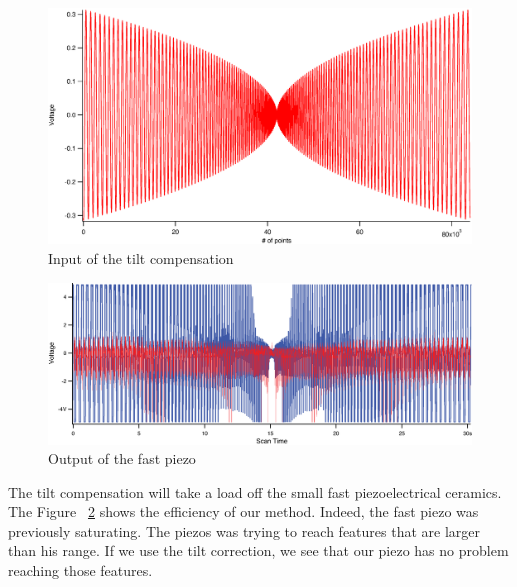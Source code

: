 \begin{figure}[H]
  \centering
  \includegraphics[scale=0.1]{images/spiralztiltout.eps}
    \caption{Input of the tilt compensation}
  \label{spiralztiltout}
\end{figure}



\begin{figure}[H]
  \centering
  \includegraphics[scale=0.1]{images/tiltcorrectiongraph.eps}
    \caption{Output of the fast piezo}
  \label{spiralzfast}
\end{figure}


The tilt compensation will take a load off the small fast piezoelectrical ceramics. The Figure ~\ref{spiralzfast} shows the efficiency of our method. Indeed, the fast piezo was previously saturating. The piezos was trying to reach features that are larger than his range. If we use the tilt correction, we see that our piezo has no problem reaching those features.
